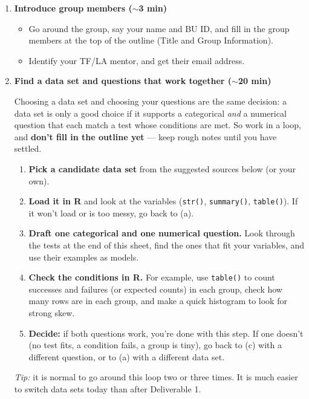 \documentclass[12pt]{article}
\begin{document}
\begin{enumerate}
    \item \textbf{Introduce group members ($\sim$3 min)}
    \begin{itemize}
        \item Go around the group, say your name and BU ID, and fill in the group members at the top of the outline (Title and Group Information).
        \item Identify your TF/LA mentor, and get their email address.
    \end{itemize}

    \item \textbf{Find a data set and questions that work together ($\sim$20 min)}

    Choosing a data set and choosing your questions are the same decision: a data set is only a good choice if it supports a categorical \emph{and} a numerical question that each match a test whose conditions are met. So work in a loop, and \textbf{don't fill in the outline yet} --- keep rough notes until you have settled.
    \begin{enumerate}
        \item \textbf{Pick a candidate data set} from the suggested sources below (or your own).
        \item \textbf{Load it in R} and look at the variables (\texttt{str()}, \texttt{summary()}, \texttt{table()}). If it won't load or is too messy, go back to (a).
        \item \textbf{Draft one categorical and one numerical question.} Look through the tests at the end of this sheet, find the ones that fit your variables, and use their examples as models.
        \item \textbf{Check the conditions in R.} For example, use \texttt{table()} to count successes and failures (or expected counts) in each group, check how many rows are in each group, and make a quick histogram to look for strong skew.
        \item \textbf{Decide:} if both questions work, you're done with this step. If one doesn't (no test fits, a condition fails, a group is tiny), go back to (c) with a different question, or to (a) with a different data set.
    \end{enumerate}
    \emph{Tip:} it is normal to go around this loop two or three times. It is much easier to switch data sets today than after Deliverable 1.


\end{enumerate}
\end{document}
